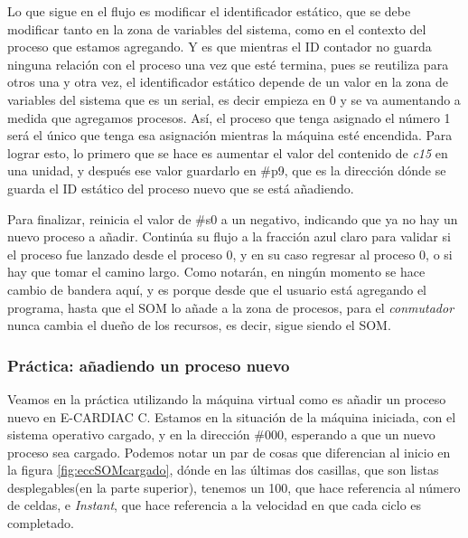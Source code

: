 \documentclass[letterpaper,12pt,oneside]{book}
\begin{document}
            Lo que sigue en el flujo  es modificar el identificador estático, que se debe modificar
			tanto en la zona de variables del sistema, como en el contexto del proceso que estamos agregando. Y es que mientras el ID contador no guarda ninguna
			relación con el proceso una vez que esté termina, pues se reutiliza para otros una y otra vez, el identificador estático depende de un valor
			en la zona de variables del sistema que es un serial, es decir empieza en 0 y se va aumentando a medida que agregamos procesos. Así, el proceso que
			tenga asignado el número 1 será el único que tenga esa asignación mientras la máquina esté encendida. Para lograr esto, lo primero que se hace es aumentar
			el valor del contenido de \textit{c15} en una unidad, y después ese valor guardarlo en \#p9, que es la dirección dónde se guarda el ID estático
			del proceso nuevo que se está añadiendo.
			
			Para finalizar, reinicia el valor de \#s0 a un negativo, indicando que ya no hay un nuevo proceso a añadir. Continúa su flujo a la fracción azul claro
			para validar si el proceso fue lanzado desde el proceso 0, y en su caso regresar al proceso 0, o si hay que tomar el camino largo.
	        Como notarán, en ningún momento se hace cambio de bandera aquí, y es porque desde que el usuario está agregando el programa, hasta que
			el SOM lo añade a la zona de procesos, para el \textit{conmutador} nunca cambia el dueño de los recursos, es decir, sigue siendo el SOM.
			
			
		
		\subsubsection{Práctica: añadiendo un proceso nuevo }		
		
			Veamos en la práctica utilizando la máquina virtual como es añadir un proceso nuevo en E-CARDIAC C. Estamos en la situación
			de la máquina iniciada, con el sistema operativo cargado, y en la dirección \#000, esperando a que un nuevo proceso sea cargado. Podemos notar
			un par de cosas que diferencian al inicio en la figura \ref{fig:eccSOMcargado}, dónde en las últimas dos casillas, que
			son listas desplegables(en la parte superior), tenemos un 100, que hace referencia al número de celdas, e \textit{Instant}, que hace referencia
			a la velocidad en que cada ciclo es completado.
\end{document}
